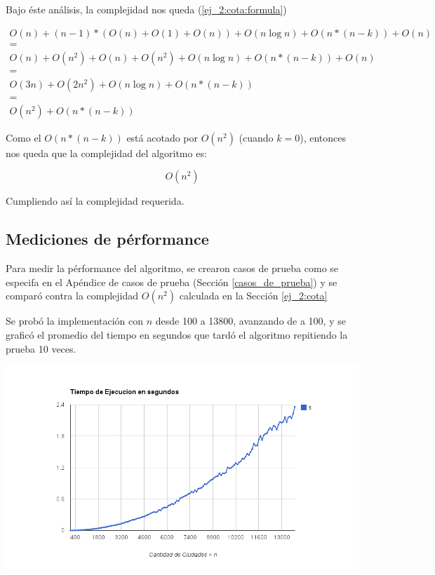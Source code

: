 Bajo \'este an\'alisis, la complejidad nos queda (\ref{ej_2:cota:formula})

\begin{equation}
\label{ej_2:cota:formula}
\begin{split}
	O(n) + (n-1)*(O(n) + O(1) + O(n)) + O(n \log n) + O(n*(n - k)) + O(n) \\
= \\
O(n) + O(n^2) + O(n) + O(n^2) + O(n \log n) + O(n*(n - k)) + O(n)\\
= \\
O(3n) + O(2n^2) + O(n \log n) + O(n*(n - k))\\
= \\
O(n^2) + O(n*(n - k))
\end{split}
\end{equation}

Como el $O(n*(n - k))$ est\'a acotado por $O(n^2)$ (cuando $k = 0$), entonces nos queda que la complejidad del algoritmo es:

\begin{equation*}
	O(n^2)
\end{equation*}

Cumpliendo as\'i la complejidad requerida.


\subsection{Mediciones de p\'erformance} \label{ej_2:performance}

Para medir la p\'erformance del algoritmo, se crearon casos de prueba como se especifa en el Ap\'endice de casos de prueba (Secci\'on \ref{casos_de_prueba}) y se compar\'o contra la complejidad $O(n^2)$ calculada en la Secci\'on \ref{ej_2:cota}

Se prob\'o la implementaci\'on con $n$ desde 100 a 13800, avanzando de a 100, y se grafic\'o el promedio del tiempo en segundos que tard\'o el algoritmo repitiendo la prueba 10 veces.

\begin{center}
	\includegraphics[scale=0.6]{images/ej2_n.png}
\end{center}

